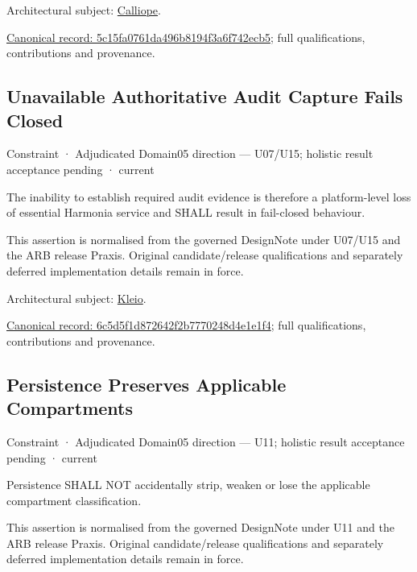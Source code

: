 Architectural subject: \hyperref[element:466ad8f75a954c0581b5bba090443849]{Calliope}.


{\footnotesize \href{../../../../continuum/motivation/constraint/5c15fa0761da496b8194f3a6f742ecb5.md}{Canonical record: 5c15fa0761da496b8194f3a6f742ecb5}; full qualifications, contributions and provenance.}\par
\subsection{Unavailable Authoritative Audit Capture Fails Closed}

\label{element:6c5d5f1d872642f2b7770248d4e1e1f4}
{\small Constraint · Adjudicated Domain05 direction — U07/U15; holistic result acceptance pending · current}\par

The inability to establish required audit evidence is therefore a platform-level loss of essential Harmonia service and SHALL result in fail-closed behaviour.



This assertion is normalised from the governed DesignNote under U07/U15 and the ARB release Praxis. Original candidate/release qualifications and separately deferred implementation details remain in force.



Architectural subject: \hyperref[element:fefda110e2274884ad58906733606efd]{Kleio}.


{\footnotesize \href{../../../../continuum/motivation/constraint/6c5d5f1d872642f2b7770248d4e1e1f4.md}{Canonical record: 6c5d5f1d872642f2b7770248d4e1e1f4}; full qualifications, contributions and provenance.}\par
\subsection{Persistence Preserves Applicable Compartments}

\label{element:6e963678cf6f4c3488c798d6afc3b910}
{\small Constraint · Adjudicated Domain05 direction — U11; holistic result acceptance pending · current}\par

Persistence SHALL NOT accidentally strip, weaken or lose the applicable compartment classification.



This assertion is normalised from the governed DesignNote under U11 and the ARB release Praxis. Original candidate/release qualifications and separately deferred implementation details remain in force.



